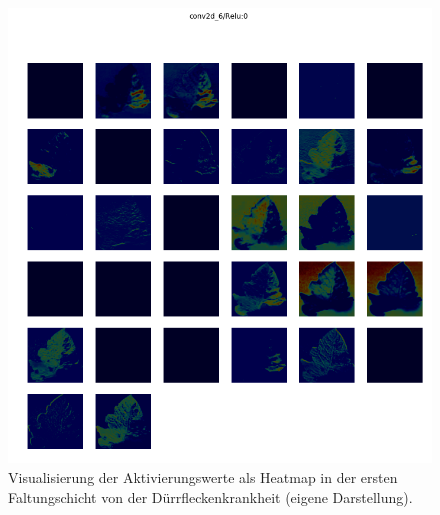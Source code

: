 
\begin{figure}[h!]
	\centering
	\includegraphics[width=\textwidth]{visualisierungen/early/heatmap_mit/conv2d_6.png}
	\caption{Visualisierung der Aktivierungswerte als Heatmap in der ersten Faltungschicht von der Dürrfleckenkrankheit (eigene Darstellung).}
	\label{}
\end{figure}

